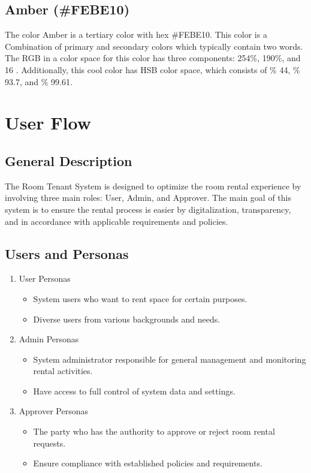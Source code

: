 \documentclass[12pt,titlepage,a4paper]{report}
\begin{document}
    \subsection*{Amber (\#FEBE10)}
    The color Amber is a tertiary color with hex \#FEBE10. This color is a Combination of primary and secondary colors which typically contain two words. The RGB in a color space for this color has three components: 254\%, 190\%, and 16 . Additionally, this cool color has HSB color space, which consists of \% 44, \% 93.7, and \% 99.61.
    \section{User Flow}
    \subsection{General Description}
    The Room Tenant System is designed to optimize the room rental experience by involving three main roles: User, Admin, and Approver. The main goal of this system is to ensure the rental process is easier by digitalization, transparency, and in accordance with applicable requirements and policies.
    \subsection{Users and Personas}
    \begin{enumerate}[label=\alph*.]
        \item User
        Personas
        \begin{itemize}
            \item System users who want to rent space for certain purposes.
            \item Diverse users from various backgrounds and needs.
        \end{itemize}
        \item Admin
        Personas
        \begin{itemize}
            \item System administrator responsible for general management and monitoring rental activities.
            \item Have access to full control of system data and settings.
        \end{itemize}
        \item Approver
        Personas
        \begin{itemize}
            \item The party who has the authority to approve or reject room rental requests.
            \item Ensure compliance with established policies and requirements.
        \end{itemize}
    \end{enumerate}
\end{document}
